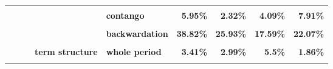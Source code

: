 \documentclass[
  authoryear,
  preprint,
  3p]{elsarticle}
\begin{document}
\begin{landscape}
\begin{longtable}[t]{>{}l>{}l>{}l>{}l>{}l>{}r>{}r>{}r>{}r}
\textbf{\cellcolor{gray!10}{}} & \textbf{\cellcolor{gray!10}{}} & \textbf{\cellcolor{gray!10}{}} & \textbf{\cellcolor{gray!10}{}} & \textbf{\cellcolor{gray!10}{backwardation}} & \textcolor[HTML]{4285f4}{\textbf{\cellcolor{gray!10}{12.81\%}}} & \textcolor[HTML]{4285f4}{\textbf{\cellcolor{gray!10}{1.01\%}}} & \textcolor[HTML]{4285f4}{\textbf{\cellcolor{gray!10}{2.97\%}}} & \textcolor[HTML]{4285f4}{\textbf{\cellcolor{gray!10}{5.68\%}}}\\
\textbf{} & \textbf{} & \textbf{} & \textbf{} & \textbf{contango} & \textcolor[HTML]{4285f4}{\textbf{5.95\%}} & \textcolor[HTML]{4285f4}{\textbf{2.32\%}} & \textcolor[HTML]{4285f4}{\textbf{4.09\%}} & \textcolor[HTML]{4285f4}{\textbf{7.91\%}}\\
\textbf{\cellcolor{gray!10}{}} & \textbf{\cellcolor{gray!10}{}} & \textbf{\cellcolor{gray!10}{}} & \textbf{\cellcolor{gray!10}{open interest}} & \textbf{\cellcolor{gray!10}{whole period}} & \textcolor[HTML]{4285f4}{\textbf{\cellcolor{gray!10}{40\%}}} & \textcolor[HTML]{4285f4}{\textbf{\cellcolor{gray!10}{33.46\%}}} & \textcolor[HTML]{4285f4}{\textbf{\cellcolor{gray!10}{21.16\%}}} & \textcolor[HTML]{4285f4}{\textbf{\cellcolor{gray!10}{27.67\%}}}\\
\textbf{} & \textbf{} & \textbf{} & \textbf{} & \textbf{backwardation} & \textcolor[HTML]{4285f4}{\textbf{38.82\%}} & \textcolor[HTML]{4285f4}{\textbf{25.93\%}} & \textcolor[HTML]{4285f4}{\textbf{17.59\%}} & \textcolor[HTML]{4285f4}{\textbf{22.07\%}}\\
\addlinespace
\textbf{\cellcolor{gray!10}{}} & \textbf{\cellcolor{gray!10}{}} & \textbf{\cellcolor{gray!10}{}} & \textbf{\cellcolor{gray!10}{}} & \textbf{\cellcolor{gray!10}{contango}} & \textcolor[HTML]{4285f4}{\textbf{\cellcolor{gray!10}{41.02\%}}} & \textcolor[HTML]{4285f4}{\textbf{\cellcolor{gray!10}{40.42\%}}} & \textcolor[HTML]{4285f4}{\textbf{\cellcolor{gray!10}{23.88\%}}} & \textcolor[HTML]{4285f4}{\textbf{\cellcolor{gray!10}{32.13\%}}}\\
\textbf{} & \textbf{} & \textbf{} & \textbf{term structure} & \textbf{whole period} & \textcolor[HTML]{4285f4}{\textbf{3.41\%}} & \textcolor[HTML]{4285f4}{\textbf{2.99\%}} & \textcolor[HTML]{4285f4}{\textbf{5.5\%}} & \textcolor[HTML]{4285f4}{\textbf{1.86\%}}\\
\textbf{\cellcolor{gray!10}{}} & \textbf{\cellcolor{gray!10}{}} & \textbf{\cellcolor{gray!10}{}} & \textbf{\cellcolor{gray!10}{}} & \textbf{\cellcolor{gray!10}{backwardation}} & \textcolor[HTML]{4285f4}{\textbf{\cellcolor{gray!10}{7.4\%}}} & \textcolor[HTML]{4285f4}{\textbf{\cellcolor{gray!10}{3.75\%}}} & \textcolor[HTML]{4285f4}{\textbf{\cellcolor{gray!10}{4.93\%}}} & \textcolor[HTML]{4285f4}{\textbf{\cellcolor{gray!10}{3.4\%}}}\\

\end{longtable}
\end{landscape}
\end{document}

